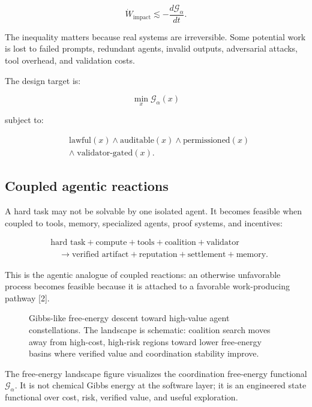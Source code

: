 \documentclass[
  11pt,
]{article}
\begin{document}
\[
\dot{W}_{\text{impact}} \lesssim -\frac{d\mathcal{G}_{\alpha}}{dt}.
\]

The inequality matters because real systems are irreversible. Some
potential work is lost to failed prompts, redundant agents, invalid
outputs, adversarial attacks, tool overhead, and validation costs.

The design target is:

\[
\boxed{
\min_x \mathcal{G}_{\alpha}(x)
}
\]

subject to:

\[
\begin{aligned}
&\text{lawful}(x)\land \text{auditable}(x)\land \text{permissioned}(x)\\
&\land\;\text{validator-gated}(x).
\end{aligned}
\]

\subsection{Coupled agentic reactions}\label{coupled-agentic-reactions}

A hard task may not be solvable by one isolated agent. It becomes
feasible when coupled to tools, memory, specialized agents, proof
systems, and incentives:

\[
\begin{aligned}
&\text{hard task}+\text{compute}+\text{tools}+\text{coalition}+\text{validator}\\
&\quad\rightarrow\text{verified artifact}+\text{reputation}+\text{settlement}+\text{memory}.
\end{aligned}
\]

This is the agentic analogue of coupled reactions: an otherwise
unfavorable process becomes feasible because it is attached to a
favorable work-producing pathway {[}2{]}.

\begin{figure}
\centering
\resizebox{0.82\textwidth}{!}{}
\caption{Gibbs-like free-energy descent toward high-value agent
constellations. The landscape is schematic: coalition search moves away
from high-cost, high-risk regions toward lower free-energy basins where
verified value and coordination stability improve.}
\end{figure}

The free-energy landscape figure visualizes the coordination free-energy functional
$\mathcal{G}_{\alpha}$. It is not chemical Gibbs energy at the
software layer; it is an engineered state functional over cost, risk,
verified value, and useful exploration.
\end{document}
